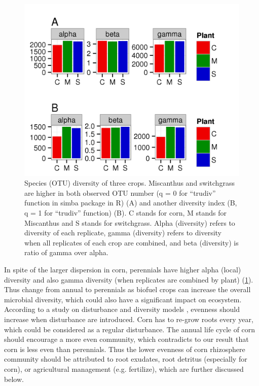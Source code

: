 \documentclass[]{msu-thesis}
\begin{document}
\begin{figure}[tbph!]
  \centering
  \includegraphics[scale=1]{figs/chap4-otu-alpha-beta-gamma-trudiv}
  \caption[Species (OTU) diversity of three crops]{Species (OTU) diversity of three crops. Miscanthus and switchgrass are higher in both observed OTU number (q = 0 for ``trudiv'' function in simba package in R) (A) and another diversity index (B, q = 1 for ``trudiv'' function) (B). C stands for corn, M stands for Miscanthus and S stands for switchgrass. Alpha (diversity) refers to diversity of each replicate, gamma (diversity) refers to diversity when all replicates of each crop are combined, and beta (diversity) is ratio of gamma over alpha.}
  \label{fig:chap4FigS2}
\end{figure}

In spite of the larger dispersion in corn, perennials have higher alpha (local) diversity and also gamma diversity (when replicates are combined by plant) (\cref{fig:chap4FigS2}). Thus change from annual to perennials as biofuel crops can increase the overall microbial diversity, which could also have a significant impact on ecosystem. According to a study on disturbance and diversity models \cite{svensson_disturbance-diversity_2012}, evenness should increase when disturbance are introduced. Corn has to re-grow roots every year, which could be considered as a regular disturbance. The annual life cycle of corn should encourage a more even community, which contradicts to our result that corn is less even than perennials. Thus the lower evenness of corn rhizosphere community should be attributed to root exudates, root detritus (especially for corn), or agricultural management (e.g. fertilize), which are further discussed below.
\end{document}
